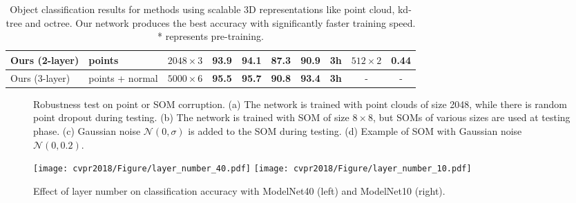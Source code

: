 \documentclass[10pt,twocolumn,letterpaper]{article}
\begin{document}
\begin{table*}[t]
{\begin{tabular}{ll||c|cc|ccc||cc}
Ours (2-layer)          & points                          & $2048\times 3$                   & 93.9          & 94.1            & 87.3  & 90.9     & 3h            & $512\times 2$            & \textbf{0.44}            \\ \hline
Ours (3-layer)          & points + normal                 & $5000\times 6$                   & \textbf{95.5} & \textbf{95.7}   & \textbf{90.8} & \textbf{93.4}     & \textbf{3h}            & -      & -         \\
\hline
\end{tabular}
}
\caption{Object classification results for methods using scalable 3D representations like point cloud, kd-tree and octree. Our network produces the best accuracy with significantly faster training speed. * represents pre-training.}
\vspace{-4pt}
\label{tbl_cls}
\end{table*}


\begin{figure*}[h!] 
        \centering
        \caption{Robustness test on point or SOM corruption. (a) The network is trained with point clouds of size 2048, while there is random point dropout during testing. (b) The network is trained with SOM of size $8\times 8$, but SOMs of various sizes are used at testing phase. (c) Gaussian noise $\mathcal{N}(0, \sigma)$ is added to the SOM during testing. (d) Example of SOM with Gaussian noise $\mathcal{N}(0, 0.2)$.} \label{fig_cls_robustness}
        \vspace{-4pt}
\end{figure*}
\begin{figure}[t] 
        \centering
        \texttt{[image: cvpr2018/Figure/layer\_number\_40.pdf]}
        \texttt{[image: cvpr2018/Figure/layer\_number\_10.pdf]}
        \caption{Effect of layer number on classification accuracy with ModelNet40 (left) and ModelNet10 (right).}
        \label{fig_layer_number}
        \vspace{-12pt}
\end{figure}
\end{document}
